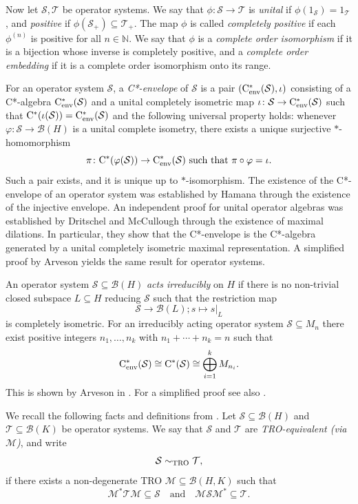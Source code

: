 \documentclass[11pt]{amsart}
\numberwithin{equation}{section}
\theoremstyle{plain}
\theoremstyle{definition}
\theoremstyle{remark}
\newcommand{\B}{{\mathcal{B}}}
\newcommand{\M}{{\mathcal{M}}}
\renewcommand{\S}{{\mathcal{S}}}
\newcommand{\T}{{\mathcal{T}}}
\def\io{\iota}
\newcommand\vphi{\varphi}
\newcommand{\qand}{\quad\text{and}\quad}
\newcommand{\ca}{\mathrm{C}^*}
\newcommand{\cenv}{\mathrm{C}^*_{\textup{env}}}
\begin{document}
Now let $\S, \T$ be operator systems. 
We say that $\phi \colon \S \to \T$ is \textit{unital} if $\phi(1_\S)=1_\T$, and \textit{positive} if $\phi(\S_+) \subseteq \T_+$. The map $\phi$ is called \textit{completely positive} if each $\phi^{(n)}$ is positive for all $n \in \mathbb{N}$. We say that $\phi$ is a \textit{complete order isomorphism} if it is a bijection whose inverse is completely positive, and a \textit{complete order embedding} if it is a complete order isomorphism onto its range.

For an operator system $\S$, a \emph{C*-envelope} of $\S$ is a pair $(\cenv(\S), \io)$ consisting of a C*-algebra $\cenv(\S)$ and a unital completely isometric map
$\io \colon \S \to \cenv(\S)$
such that $\ca(\io(\S)) = \cenv(\S)$ and the following universal property holds:
whenever $\vphi \colon \S \to \B(H)$ is a unital complete isometry, there exists a unique surjective $*$-homomorphism
\[
\pi \colon \ca(\vphi(\S)) \to \cenv(\S)
\text{ such that }
\pi \circ \vphi = \io.
\]
Such a pair exists, and it is unique up to $*$-isomorphism. The existence of the C*-envelope of an operator system was established by Hamana \cite{Ham79} through the existence of the injective envelope.
An independent proof for unital operator algebras was established by Dritschel and McCullough \cite{DM05} through the existence of maximal dilations. In particular, they show that the C*-envelope is the C*-algebra generated by a unital completely isometric maximal representation.
A simplified proof by Arveson \cite{Arv08} yields the same result for operator systems. 

An operator system $\S \subseteq \B(H)$ \emph{acts irreducibly} on $H$ if there is no non-trivial closed subspace $L \subseteq H$ 
reducing $\S$ such that the restriction map
\[
\S \to \B(L) ; s \mapsto s|_{L}
\]
is completely isometric. For an irreducibly acting operator system $\S\subseteq M_n$ there exist positive integers $n_{1},\dots,n_{k}$ 
with $n_{1}+\cdots+n_{k} = n$ such that
\[
\cenv(\S) \cong \ca(\S) \cong \bigoplus_{i=1}^{k} M_{n_{i}}.
\]
This is shown by Arveson in \cite{Arv11}. For a simplified proof see also \cite[Proposition 7.1]{EKT21}.

We recall the following facts and definitions from \cite{EKT21}. Let $\S \subseteq \B(H)$ and $\T \subseteq \B(K)$ be operator systems. 
We say that $\S$ and $\T$ are \emph{TRO-equivalent (via $\M$)}, and write 
\[
\S \sim_{\rm TRO} \T,
\]
if there exists a non-degenerate TRO $\M \subseteq \B(H,K)$ such that
\[
\M^* \T \M \subseteq \S
\qand
\M \S \M^* \subseteq \T.
\]
\end{document}
